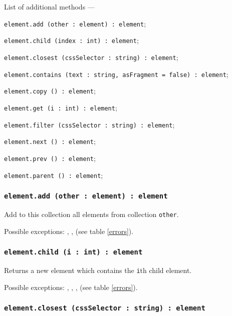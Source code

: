 List of additional methods —
\begin{icItems}
	\item \texttt{element.add (other : element) : element};
	\item \texttt{element.child (index : int) : element};
	\item \texttt{element.closest (cssSelector : string) : element};
	\item \texttt{element.contains (text : string, asFragment = false) : element};
	\item \texttt{element.copy () : element};
	\item \texttt{element.get (i : int) : element};
	\item \texttt{element.filter (cssSelector : string) : element};
	\item \texttt{element.next () : element};
	\item \texttt{element.prev () : element};
	\item \texttt{element.parent () : element};
\end{icItems}

\subsubsection{\texttt{element.add (other : element) : element}}

Add to this collection all elements from collection \texttt{other}.

Possible exceptions: , ,  (see table \ref{errors}).

\subsubsection{\texttt{element.child (i : int) : element}}

Returns a new element which contains the \texttt{i}th child element.

Possible exceptions: , , ,  (see table \ref{errors}).

\subsubsection{\texttt{element.closest (cssSelector : string) : element}}

